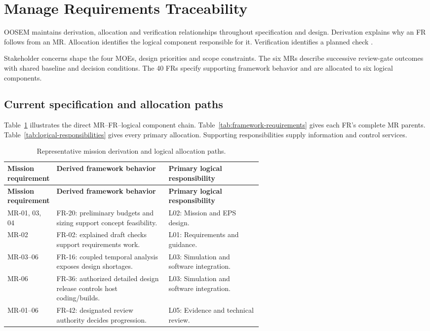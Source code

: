 \section{Manage Requirements Traceability}
\label{section:manage-requirements-traceability}

OOSEM maintains derivation, allocation and verification relationships throughout specification and design. Derivation explains why an FR follows from an MR. Allocation identifies the logical component responsible for it. Verification identifies a planned check \citep[Sec.~17.3.7]{friedenthal2014practical}.

Stakeholder concerns shape the four MOEs, design priorities and scope constraints. The six MRs describe successive review-gate outcomes with shared baseline and decision conditions. The 40 FRs specify supporting framework behavior and are allocated to six logical components.

\subsection{Current specification and allocation paths}

Table~\ref{tab:framework-root-traces} illustrates the direct MR--FR--logical component chain. Table~\ref{tab:framework-requirements} gives each FR's complete MR parents. Table~\ref{tab:logical-responsibilities} gives every primary allocation. Supporting responsibilities supply information and control services.

{\small
\setlength{\tabcolsep}{4pt}
\renewcommand{\arraystretch}{1.08}
\begin{longtable}{@{}>{\raggedright\arraybackslash}p{0.16\linewidth}>{\raggedright\arraybackslash}p{0.44\linewidth}>{\raggedright\arraybackslash}p{}@{}}
\caption{Representative mission derivation and logical allocation paths.}\label{tab:framework-root-traces}\\
\toprule
\textbf{Mission requirement} & \textbf{Derived framework behavior} & \textbf{Primary logical responsibility} \\
\midrule
\endfirsthead
\toprule \textbf{Mission requirement} & \textbf{Derived framework behavior} & \textbf{Primary logical responsibility} \\
\midrule
\endhead
\bottomrule
\endfoot
MR-01, 03, 04 & FR-20: preliminary budgets and sizing support concept feasibility. & L02: Mission and EPS design. \\
MR-02 & FR-02: explained draft checks support requirements work. & L01: Requirements and guidance. \\
MR-03--06 & FR-16: coupled temporal analysis exposes design shortages. & L03: Simulation and software integration. \\
MR-06 & FR-36: authorized detailed design release controls host coding/builds. & L03: Simulation and software integration. \\
MR-01--06 & FR-42: designated review authority decides progression. & L05: Evidence and technical review. \\
\end{longtable}
}

